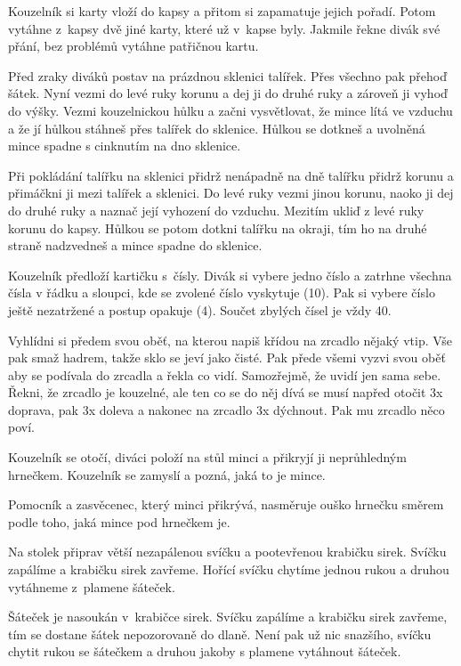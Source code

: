Kouzelník si karty vloží do kapsy a přitom si zapamatuje 
jejich pořadí. Potom vytáhne z~kapsy dvě jiné karty, které 
už v~kapse byly. Jakmile řekne divák své přání, bez problémů 
vytáhne patřičnou kartu.


Před zraky diváků postav na prázdnou sklenici talířek. 
Přes všechno pak přehoď šátek. Nyní vezmi do levé ruky korunu 
a dej ji do druhé ruky a zároveň ji vyhoď do výšky. Vezmi kouzelnickou 
hůlku a začni vysvětlovat, že mince lítá ve vzduchu a že jí hůlkou 
stáhneš přes talířek do sklenice. Hůlkou se dotkneš a uvolněná 
mince spadne s cinknutím na dno sklenice.

Při pokládání talířku na sklenici přidrž nenápadně na dně 
talířku přidrž korunu a přimáčkni ji mezi talířek a sklenici. 
Do levé ruky vezmi jinou korunu, naoko ji dej do druhé ruky a 
naznač její vyhození do vzduchu. Mezitím ukliď z levé ruky korunu 
do kapsy. Hůlkou se potom dotkni talířku na okraji, tím ho na 
druhé straně nadzvedneš a mince spadne do sklenice.


Kouzelník předloží kartičku s~čísly. Divák si vybere 
jedno číslo a zatrhne všechna čísla v řádku a sloupci, kde se 
zvolené číslo vyskytuje (10). Pak si vybere číslo ještě nezatržené 
a postup opakuje (4). Součet zbylých čísel je vždy 40.


Vyhlídni si předem svou oběť, na kterou napiš křídou 
na zrcadlo nějaký vtip. Vše pak smaž hadrem, takže sklo se jeví 
jako čisté. Pak přede všemi vyzvi svou oběť aby se podívala do 
zrcadla a řekla co vidí. Samozřejmě, že uvidí jen sama sebe. 
Řekni, že zrcadlo je kouzelné, ale ten co se do něj dívá se musí 
napřed otočit 3x doprava, pak 3x doleva a nakonec na zrcadlo 
3x dýchnout. Pak mu zrcadlo něco poví.


Kouzelník se otočí, diváci položí na stůl minci a přikryjí 
ji neprůhledným hrnečkem. Kouzelník se zamyslí a pozná, jaká 
to je mince.

Pomocník a zasvěcenec, který minci přikrývá, nasměruje ouško 
hrnečku směrem podle toho, jaká mince pod hrnečkem je.


Na stolek připrav větší nezapálenou svíčku a pootevřenou 
krabičku sirek. Svíčku zapálíme a krabičku sirek zavřeme. Hořící 
svíčku chytíme jednou rukou a druhou vytáhneme z~plamene 
šáteček.

Šáteček je nasoukán v~krabičce sirek. Svíčku zapálíme 
a krabičku sirek zavřeme, tím se dostane šátek nepozorovaně do 
dlaně. Není pak už nic snazšího, svíčku chytit rukou se šátečkem 
a druhou jakoby s plamene vytáhnout šáteček.


